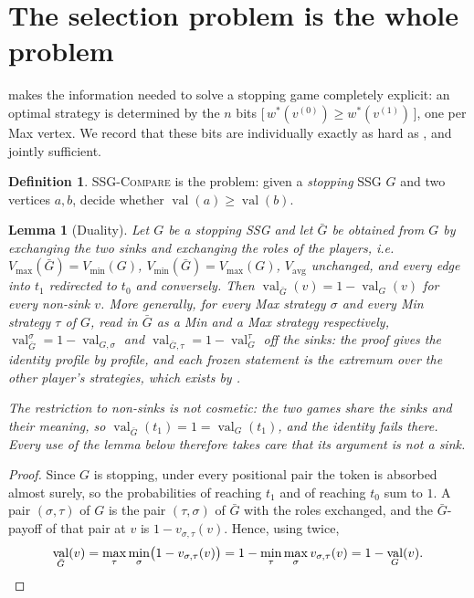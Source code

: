 \documentclass[11pt]{article}
\theoremstyle{plain}
\newtheorem{lemma}[theorem]{Lemma}
\theoremstyle{definition}
\newtheorem{definition}[theorem]{Definition}
\DeclareMathOperator{\val}{val}
\newcommand{\Vmax}{V_{\max}}
\newcommand{\Vmin}{V_{\min}}
\newcommand{\Vavg}{V_{\mathrm{avg}}}
\begin{document}
\section{The selection problem is the whole problem}\label{sec:selection}

 makes the information needed to solve a stopping
game completely explicit: an optimal strategy is determined by the $n$
bits $\bigl[\,w^\ast(v^{(0)})\ge w^\ast(v^{(1)})\,\bigr]$, one per Max
vertex. We record that these bits are individually exactly as hard as
, and jointly sufficient.

\begin{definition}
\textsc{SSG-Compare} is the problem: given a \emph{stopping} SSG $G$ and
two vertices $a,b$, decide whether $\val(a)\ge\val(b)$.
\end{definition}

\begin{lemma}[Duality]\label{lem:duality}
Let $G$ be a stopping SSG and let $\bar G$ be obtained from $G$ by
exchanging the two sinks and exchanging the roles of the players, i.e.\
$\Vmax(\bar G)=\Vmin(G)$, $\Vmin(\bar G)=\Vmax(G)$, $\Vavg$ unchanged,
and every edge into $t_1$ redirected to $t_0$ and conversely. Then
$\val_{\bar G}(v)=1-\val_G(v)$ for every \emph{non-sink} $v$. More
generally, for every Max strategy $\sigma$ and every Min strategy $\tau$
of $G$, read in $\bar G$ as a Min and a Max strategy respectively,
$\val^{\sigma}_{\bar G}=1-\val_{G,\sigma}$ and
$\val_{\bar G,\tau}=1-\val^{\tau}_{G}$ off the sinks: the proof gives the
identity profile by profile, and each frozen statement is the extremum
over the other player's strategies, which exists by
.

The restriction to non-sinks is not cosmetic: the two games share the
sinks and their meaning, so $\val_{\bar G}(t_1)=1=\val_G(t_1)$, and the
identity fails there. Every use of the lemma below therefore takes care
that its argument is not a sink.
\end{lemma}

\begin{proof}
Since $G$ is stopping, under every positional pair the token is absorbed
almost surely, so the probabilities of reaching $t_1$ and of reaching
$t_0$ sum to $1$. A pair $(\sigma,\tau)$ of $G$ is the pair
$(\tau,\sigma)$ of $\bar G$ with the roles exchanged, and the $\bar
G$-payoff of that pair at $v$ is $1-v_{\sigma,\tau}(v)$. Hence, using
\Cref{thm:determinacy} twice,
\[
  \val_{\bar G}(v)=\max_\tau\min_\sigma\bigl(1-v_{\sigma,\tau}(v)\bigr)
  =1-\min_\tau\max_\sigma v_{\sigma,\tau}(v)=1-\val_G(v). \qedhere
\]
\end{proof}
\end{document}
